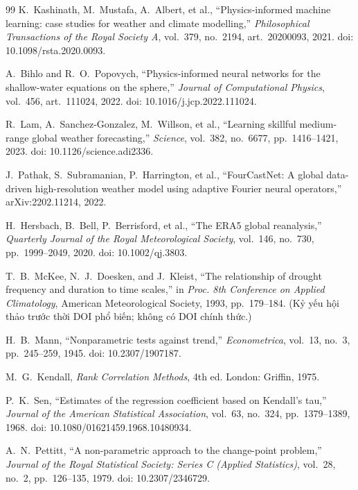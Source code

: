 \documentclass[12pt,a4paper]{report}
\begin{document}
\begin{thebibliography}{99}
 K.~Kashinath, M.~Mustafa, A.~Albert, et al., ``Physics-informed machine learning: case studies for weather and climate modelling,'' \emph{Philosophical Transactions of the Royal Society A}, vol.~379, no.~2194, art.~20200093, 2021. doi: 10.1098/rsta.2020.0093.

 A.~Bihlo and R.~O.~Popovych, ``Physics-informed neural networks for the shallow-water equations on the sphere,'' \emph{Journal of Computational Physics}, vol.~456, art.~111024, 2022. doi: 10.1016/j.jcp.2022.111024.

 R.~Lam, A.~Sanchez-Gonzalez, M.~Willson, et al., ``Learning skillful medium-range global weather forecasting,'' \emph{Science}, vol.~382, no.~6677, pp.~1416--1421, 2023. doi: 10.1126/science.adi2336.

 J.~Pathak, S.~Subramanian, P.~Harrington, et al., ``FourCastNet: A global data-driven high-resolution weather model using adaptive Fourier neural operators,'' arXiv:2202.11214, 2022.

 H.~Hersbach, B.~Bell, P.~Berrisford, et al., ``The ERA5 global reanalysis,'' \emph{Quarterly Journal of the Royal Meteorological Society}, vol.~146, no.~730, pp.~1999--2049, 2020. doi: 10.1002/qj.3803.

 T.~B.~McKee, N.~J.~Doesken, and J.~Kleist, ``The relationship of drought frequency and duration to time scales,'' in \emph{Proc. 8th Conference on Applied Climatology}, American Meteorological Society, 1993, pp.~179--184. (Kỷ yếu hội thảo trước thời DOI phổ biến; không có DOI chính thức.)

 H.~B.~Mann, ``Nonparametric tests against trend,'' \emph{Econometrica}, vol.~13, no.~3, pp.~245--259, 1945. doi: 10.2307/1907187.

 M.~G.~Kendall, \emph{Rank Correlation Methods}, 4th ed. London: Griffin, 1975.

 P.~K.~Sen, ``Estimates of the regression coefficient based on Kendall's tau,'' \emph{Journal of the American Statistical Association}, vol.~63, no.~324, pp.~1379--1389, 1968. doi: 10.1080/01621459.1968.10480934.

 A.~N.~Pettitt, ``A non-parametric approach to the change-point problem,'' \emph{Journal of the Royal Statistical Society: Series C (Applied Statistics)}, vol.~28, no.~2, pp.~126--135, 1979. doi: 10.2307/2346729.


\end{thebibliography}
\end{document}
